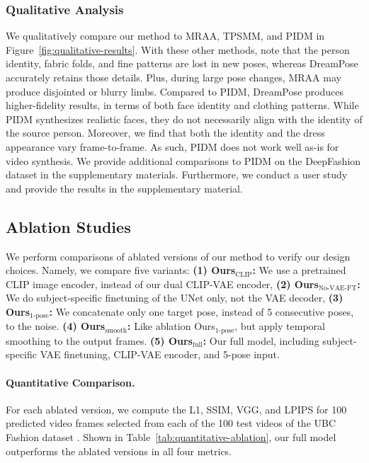         \subsubsection{Qualitative Analysis} We qualitatively compare our method to MRAA, TPSMM, and PIDM in Figure~\ref{fig:qualitative-results}.  With these other methods, note that the person identity, fabric folds, and fine patterns are lost in new poses, whereas DreamPose accurately retains those details. Plus, during large pose changes, MRAA may produce disjointed or blurry limbs. 
        Compared to PIDM, DreamPose produces higher-fidelity results, in terms of both face identity and clothing patterns. While PIDM synthesizes realistic faces, they do not necessarily align with the identity of the source person. Moreover, we find that both the identity and the dress appearance vary frame-to-frame. As such, PIDM does not work well as-is for video synthesis.  We provide additional comparisons to PIDM on the DeepFashion dataset \cite{deep-fashion} in the supplementary materials.
        Furthermore, we conduct a user study and provide the results in the supplementary material.
        
        

    \subsection{Ablation Studies}
    We perform comparisons of ablated versions of our method to verify our design choices. Namely, we compare five variants: \textbf{(1) Ours$_{\text{CLIP}}$:} We use a pretrained CLIP image encoder, instead of our dual CLIP-VAE encoder, \textbf{(2) Ours$_{\text{No-VAE-FT}}$:} We do subject-specific finetuning of the UNet only, not the VAE decoder, \textbf{(3) Ours$_{\text{1-pose}}$:} We concatenate only one target pose, instead of 5 consecutive poses, to the noise. \textbf{(4) Ours$_\text{smooth}$:} Like ablation Ours$_{\text{1-pose}}$, but apply temporal smoothing to the output frames. \textbf{(5) Ours$_\text{full}$:} Our full model, including subject-specific VAE finetuning, CLIP-VAE encoder, and 5-pose input.

    \paragraph{Quantitative Comparison.} For each ablated version, we compute the L1, SSIM, VGG, and LPIPS for 100 predicted video frames selected from each of the 100 test videos of the UBC Fashion dataset \cite{ubc_fashion}. Shown in Table~\ref{tab:quantitative-ablation}, our full model outperforms the ablated versions in all four metrics.


